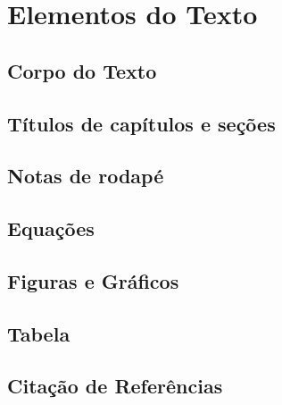 \chapter[Elementos do Texto]{Elementos do Texto}

\section{Corpo do Texto}


\section{Títulos de capítulos e seções}


\section{Notas de rodapé}


\section{Equações}


\section{Figuras e Gráficos}

\section{Tabela}


\section{Citação de Referências}